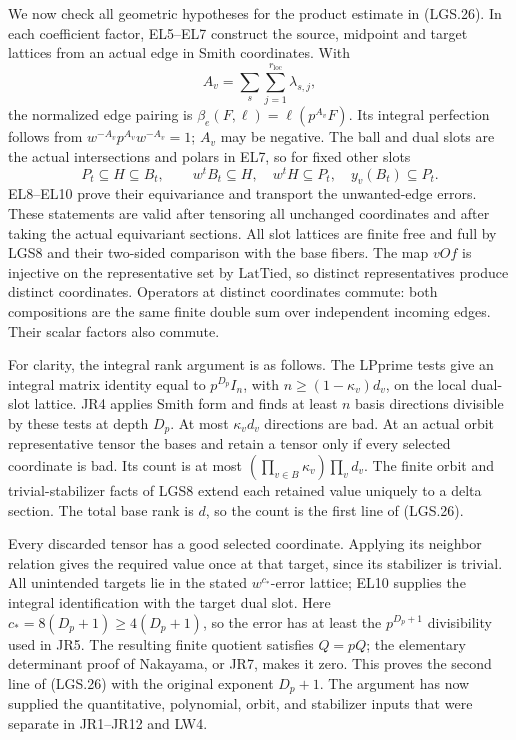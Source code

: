 We now check all geometric hypotheses for the product
estimate in (LGS.26).  In each coefficient factor, EL5--EL7
construct the source, midpoint and target lattices from an
actual edge in Smith coordinates.  With
\[
 A_v=\sum_s\sum_{j=1}^{r_{\mathrm{loc}}}\lambda_{s,j},
 \]
the normalized edge pairing is
\(\beta_e(F,\ell)=\ell(p^{A_v}F)\).
Its integral perfection follows from
\(w^{-A_v}p^{A_v}w^{-A_v}=1\); \(A_v\) may be negative.
The ball and dual slots are the actual intersections and
polars in EL7, so for fixed other slots
\[
 P_t\subseteq H\subseteq B_t,\qquad
 w^tB_t\subseteq H,\quad w^tH\subseteq P_t,\quad
 y_v(B_t)\subseteq P_t.                                \tag{LGS.27}
\]
EL8--EL10 prove their equivariance and transport the
unwanted-edge errors.  These statements are valid after
tensoring all unchanged coordinates and after taking
the actual equivariant sections.  All slot lattices are
finite free and full by LGS8 and their two-sided
comparison with the base fibers.
The map \(vOf\) is injective on the representative set
by \(\mathrm{LatTied}\), so distinct representatives
produce distinct coordinates.  Operators at distinct
coordinates commute: both compositions are the same
finite double sum over independent incoming edges.
Their scalar factors also commute.

For clarity, the integral rank argument is as follows.
The \(\mathrm{LPprime}\) tests give an integral matrix
identity equal to \(p^{D_p}I_n\), with
\(n\ge(1-\kappa_v)d_v\), on the local dual-slot lattice.
JR4 applies Smith form and finds at least \(n\) basis
directions divisible by these tests at depth \(D_p\).
At most \(\kappa_vd_v\) directions are bad.
At an actual orbit representative tensor the bases and
retain a tensor only if every selected coordinate is bad.
Its count is at most
\((\prod_{v\in B}\kappa_v)\prod_vd_v\).
The finite orbit and trivial-stabilizer facts of LGS8
extend each retained value uniquely to a delta section.
The total base rank is \(d\), so the count is the first
line of (LGS.26).

Every discarded tensor has a good selected coordinate.
Applying its neighbor relation gives the required value
once at that target, since its stabilizer is trivial.
All unintended targets lie in the stated
\(w^{c_*}\)-error lattice; EL10 supplies the integral
identification with the target dual slot.
Here \(c_*=8(D_p+1)\ge4(D_p+1)\), so the error has
at least the \(p^{D_p+1}\) divisibility used in JR5.
The resulting finite quotient satisfies \(Q=pQ\);
the elementary determinant proof of Nakayama, or JR7,
makes it zero.  This proves the second line of
(LGS.26) with the original exponent \(D_p+1\).
The argument has now supplied the quantitative,
polynomial, orbit, and stabilizer inputs that were
separate in JR1--JR12 and LW4.

